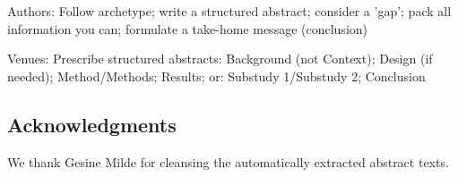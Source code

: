 \documentclass[10pt,journal,compsoc]{IEEEtran}
\newcommand{\ifarxiv}[1]{#1}  %
\begin{document}
\noindent
Authors: Follow archetype; write a structured abstract; consider a 'gap'; pack all information you can; formulate a take-home message (conclusion)

Venues: Prescribe structured abstracts: Background (not Context); Design (if needed); Method/Methods; Results; or: Substudy 1/Substudy 2; Conclusion





\subsection*{Acknowledgments}
\noindent We thank Gesine Milde for cleansing the automatically extracted abstract texts.
	


	


\ifarxiv{}
	
\end{document}
